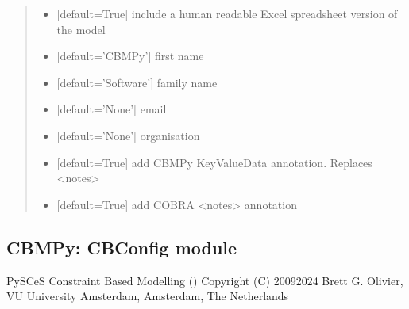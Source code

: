 \documentclass[letterpaper,12pt,english]{sphinxmanual}
\begin{document}
\begin{fulllineitems}
\begin{quote}
\begin{description}
\begin{itemize}
\item {} 
\sphinxAtStartPar
{} \textendash{} {[}default=True{]} include a human readable Excel spreadsheet version of the model

\item {} 
\sphinxAtStartPar
{} \textendash{} {[}default=’CBMPy’{]} first name

\item {} 
\sphinxAtStartPar
{} \textendash{} {[}default=’Software’{]} family name

\item {} 
\sphinxAtStartPar
{} \textendash{} {[}default=’None’{]} email

\item {} 
\sphinxAtStartPar
{} \textendash{} {[}default=’None’{]} organisation

\item {} 
\sphinxAtStartPar
{} \textendash{} {[}default=True{]} add CBMPy KeyValueData annotation. Replaces \textless{}notes\textgreater{}

\item {} 
\sphinxAtStartPar
{} \textendash{} {[}default=True{]} add COBRA \textless{}notes\textgreater{} annotation

\end{itemize}

\end{description}\end{quote}

\end{fulllineitems}


\subsection{CBMPy: CBConfig module}
\label{\detokenize{api/core:cbmpy-cbconfig-module}}\label{\detokenize{api/core:module-cbmpy.CBConfig}}
\sphinxAtStartPar
PySCeS Constraint Based Modelling ()
Copyright (C) 2009\sphinxhyphen{}2024 Brett G. Olivier, VU University Amsterdam, Amsterdam, The Netherlands
\end{document}
